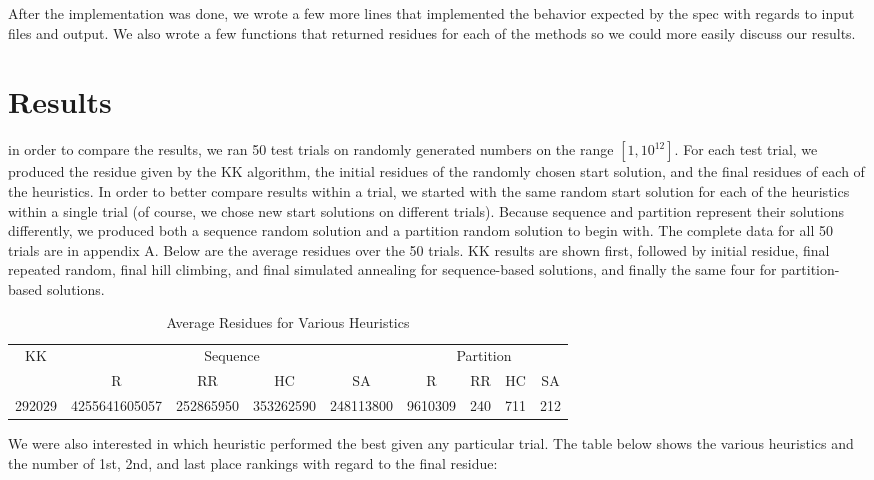 \documentclass[12pt]{article}
\begin{document}
After the implementation was done, we wrote a few more lines that implemented the behavior expected by the spec with regards to input files and output. We also wrote a few functions that returned residues for each of the methods so we could more easily discuss our results. 

\section{Results}
in order to compare the results, we ran 50 test trials on randomly generated numbers on the range $[1, 10^{12}]$. For each test trial, we produced the residue given by the KK algorithm, the initial residues of the randomly chosen start solution, and the final residues of each of the heuristics. In order to better compare results within a trial, we started with the same random start solution for each of the heuristics within a single trial (of course, we chose new start solutions on different trials). Because sequence and partition represent their solutions differently, we produced both a sequence random solution and a partition random solution to begin with. The complete data for all 50 trials are in appendix A. Below are the average residues over the 50 trials. KK results are shown first, followed by initial residue, final repeated random, final hill climbing, and final simulated annealing for sequence-based solutions, and finally the same four for partition-based solutions.

\begin{table}[h]
\renewcommand{\arraystretch}{1.3}
\begin{center}
\begin{tabular}{c | c c c c | c c c c}
\multirow{2}{*}{KK} & \multicolumn{4}{c|}{Sequence} & \multicolumn{4}{c}{Partition} \\
& R & RR & HC & SA & R & RR & HC & SA \\ \hline
292029 & 4255641605057 & 252865950 & 353262590 & 248113800 & 9610309 & 240 & 711 & 212 \\
\end{tabular}
\caption{Average Residues for Various Heuristics}
\end{center}
\end{table}

We were also interested in which heuristic performed the best given any particular trial. The table below shows the various heuristics and the number of 1st, 2nd, and last place rankings with regard to the final residue:
\end{document}
